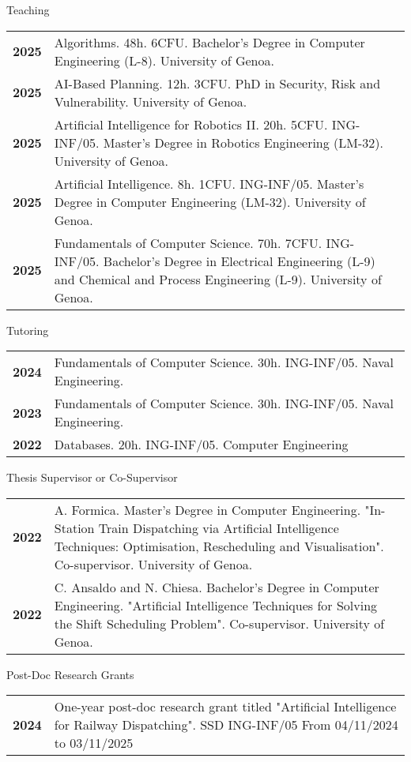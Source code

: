 \documentclass{resume} %
\begin{document}
\begin{rSection}{Teaching}
	\begin{tabularx}{0.95\textwidth} {lp{14cm}}
 \textbf{2025} & Algorithms. 48h. 6CFU. Bachelor's Degree in Computer Engineering (L-8). University of Genoa.  \\
 \textbf{2025} & AI-Based Planning. 12h. 3CFU. PhD in Security, Risk and Vulnerability. University of Genoa.  \\
 \textbf{2025} & Artificial Intelligence for Robotics II. 20h. 5CFU. ING-INF/05. Master’s Degree in Robotics Engineering (LM-32). University of Genoa.  \\
  \textbf{2025} & Artificial Intelligence. 8h. 1CFU. ING-INF/05. Master’s Degree in Computer Engineering (LM-32). University of Genoa.  \\
  \textbf{2025} & Fundamentals of Computer Science. 70h. 7CFU. ING-INF/05. Bachelor’s Degree in Electrical Engineering (L-9) and Chemical and Process Engineering (L-9). University of Genoa.  \\
\end{tabularx}
\pagebreak
\end{rSection}
\begin{rSection}{Tutoring}
	\begin{tabularx}{0.95\textwidth} {lp{14cm}}
 \textbf{2024} & Fundamentals of Computer Science. 30h. ING-INF/05. Naval Engineering.  \\
 \textbf{2023} & Fundamentals of Computer Science. 30h. ING-INF/05. Naval Engineering.  \\
 \textbf{2022} & Databases. 20h. ING-INF/05. Computer Engineering \end{tabularx}
\end{rSection}
\begin{rSection}{Thesis Supervisor or Co-Supervisor}
	\begin{tabularx}{0.95\textwidth} {lp{14cm}}
 \textbf{2022} & A. Formica. Master’s Degree in Computer Engineering. "In-Station Train Dispatching via Artificial Intelligence Techniques: Optimisation, Rescheduling and Visualisation". Co-supervisor. University of Genoa.  \\
 \textbf{2022} & C. Ansaldo and N. Chiesa. Bachelor’s Degree in Computer Engineering. "Artificial Intelligence Techniques for Solving the Shift Scheduling Problem". Co-supervisor. University of Genoa.
 \end{tabularx}
\end{rSection}

\begin{rSection}{Post-Doc Research Grants}
	\begin{tabularx}{0.95\textwidth} {lp{14cm}}
 \textbf{2024} & One-year post-doc research grant titled "Artificial Intelligence for Railway Dispatching". SSD ING-INF/05 From 04/11/2024 to 03/11/2025
 \end{tabularx}
\end{rSection}
\end{document}
